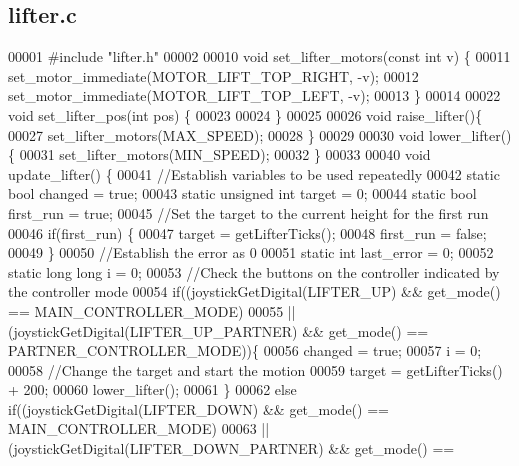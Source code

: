 \subsection{lifter.\+c}
\label{lifter_8c_source}

\begin{DoxyCode}
00001 \textcolor{preprocessor}{#include "lifter.h"}
00002 
00010 \textcolor{keywordtype}{void} set_lifter_motors(\textcolor{keyword}{const} \textcolor{keywordtype}{int} v) \{
00011   set_motor_immediate(MOTOR_LIFT_TOP_RIGHT, -v);
00012   set_motor_immediate(MOTOR_LIFT_TOP_LEFT, -v);
00013 \}
00014 
00022 \textcolor{keywordtype}{void} set_lifter_pos(\textcolor{keywordtype}{int} pos) \{
00023 
00024 \}
00025 
00026 \textcolor{keywordtype}{void} raise_lifter()\{
00027   set_lifter_motors(MAX_SPEED);
00028 \}
00029 
00030 \textcolor{keywordtype}{void} lower_lifter()\{
00031   set_lifter_motors(MIN_SPEED);
00032 \}
00033 
00040 \textcolor{keywordtype}{void} update_lifter() \{
00041   \textcolor{comment}{//Establish variables to be used repeatedly}
00042   \textcolor{keyword}{static} \textcolor{keywordtype}{bool} changed = \textcolor{keyword}{true};
00043   \textcolor{keyword}{static} \textcolor{keywordtype}{unsigned} \textcolor{keywordtype}{int} target = 0;
00044   \textcolor{keyword}{static} \textcolor{keywordtype}{bool} first\_run = \textcolor{keyword}{true};
00045   \textcolor{comment}{//Set the target to the current height for the first run}
00046   \textcolor{keywordflow}{if}(first\_run) \{
00047     target = getLifterTicks();
00048     first\_run = \textcolor{keyword}{false};
00049   \}
00050   \textcolor{comment}{//Establish the error as 0}
00051   \textcolor{keyword}{static} \textcolor{keywordtype}{int} last\_error = 0;
00052   \textcolor{keyword}{static} \textcolor{keywordtype}{long} \textcolor{keywordtype}{long} i = 0;
00053   \textcolor{comment}{//Check the buttons on the controller indicated by the controller mode}
00054   \textcolor{keywordflow}{if}((joystickGetDigital(LIFTER_UP) && get_mode() == MAIN_CONTROLLER_MODE)
00055    || (joystickGetDigital(LIFTER_UP_PARTNER) && get_mode() == 
      PARTNER_CONTROLLER_MODE))\{
00056     changed = \textcolor{keyword}{true};
00057     i = 0;
00058     \textcolor{comment}{//Change the target and start the motion}
00059     target = getLifterTicks() + 200;
00060     lower_lifter();
00061   \}
00062   \textcolor{keywordflow}{else} \textcolor{keywordflow}{if}((joystickGetDigital(LIFTER_DOWN) && get_mode() == MAIN_CONTROLLER_MODE)
00063    || (joystickGetDigital(LIFTER_DOWN_PARTNER) && get_mode() == 

\end{DoxyCode}

